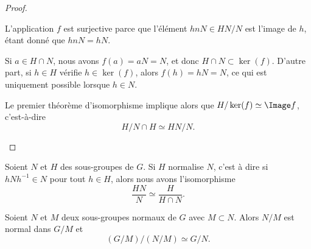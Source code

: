 \begin{proof}
\begin{enumerate}
		      Le premier théorème d'isomorphisme implique alors que \( H/\ker(f)\simeq \Image f\), c'est-à-dire
		      \begin{equation}
			      H/N\cap H\simeq HN/N.
		      \end{equation}
	\end{enumerate}
\end{proof}

\begin{proposition}     \label{PROPooVBGMooPTlyLF}
    Soient \( N\) et \( H\) des sous-groupes de \( G\). Si \( H\) normalise \( N\), c'est à dire si \( hNh^{-1}\in N\) pour tout \( h\in H\), alors nous avons l'isomorphisme
  \begin{equation}
      \frac{ HN }{ N }\simeq\frac{ H }{ H\cap N }.
  \end{equation}
\end{proposition}

\begin{theorem}  \label{ThoezgBep}
	Soient \( N\) et \( M\) deux sous-groupes normaux de \( G\) avec \( M\subset N\). Alors \( N/M\) est normal dans \( G/M\) et
	\begin{equation}
		(G/M)/(N/M)\simeq G/N.
	\end{equation}
\end{theorem}

